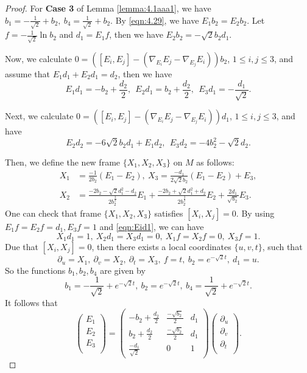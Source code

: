 \documentclass[reqno]{amsart}%
\theoremstyle{definition}
\numberwithin{equation}{section}
\begin{document}
\begin{proof}
For {\bf Case 3} of Lemma \ref{lemma:4.1aaa1}, we have $b_1=-\frac{1}{\sqrt{2}}+b_2,\ b_4=\frac{1}{\sqrt{2}}+b_2$. By \eqref{eqn:4.29}, we have $E_1b_2=E_2b_2$. Let $f=-\frac{1}{\sqrt{2}}\ln b_2$ and $d_1=E_1f$,
then we have $E_2b_2=-\sqrt{2}b_2d_1$.

Now, we calculate $0=([E_i,E_j]-(\nabla_{E_i}{E_j}-\nabla_{E_j}{E_i}))b_2$, $1\leq i,j\leq3$, and assume that $E_1d_1+E_2d_1=d_2$, then we have
\begin{equation}\label{eqn:Eid1}
E_1d_1=-b_2+\frac{d_2}{2},\ \ E_2d_1=b_2+\frac{d_2}{2},\ \ E_3d_1=-\frac{d_1}{\sqrt{2}}.
\end{equation}

Next, we calculate $0=([E_i,E_j]-(\nabla_{E_i}{E_j}-\nabla_{E_j}{E_i}))d_1$, $1\leq i,j\leq3$, and have
\begin{equation}\label{eqn:Eid2}
E_2d_2=-6\sqrt{2}b_2d_1+E_1d_2,\ \ E_3d_2=-4b_2^2-\sqrt{2}d_2.
\end{equation}

Then, we define the new frame $\{X_1,X_2,X_3\}$ on $M$ as follows:
$$
\begin{aligned}
X_1&=\frac{-1}{2b_2}(E_1-E_2),\ X_3=\frac{-d_1}{2\sqrt{2}b_2}(E_1-E_2)+E_3,\\
X_2&=\frac{-2b_2-\sqrt{2}d_1^2-d_2}{2b_2^{\frac{3}{2}}}E_1+\frac{-2b_2+\sqrt{2}d_1^2+d_2}
{2b_2^{\frac{3}{2}}}E_2+\frac{2d_1}{\sqrt{b_2}}E_3.
\end{aligned}
$$
One can check that frame $\{X_1,X_2,X_3\}$ satisfies $[X_i,X_j]=0$. By using $E_1f=E_2f=d_1,E_3f=1$ and
\eqref{eqn:Eid1}, we can have
$$
X_1d_1=1,\ X_2d_1=X_3d_1=0,\ X_1f=X_2f=0,\ X_3f=1.
$$
Due that $[X_i,X_j]=0$, then there exists a local coordinates $\{u,v,t\}$, such that
$$
\partial_u=X_1,\ \partial_v=X_2,\ \partial_t=X_3,\ f=t,\ b_2=e^{-\sqrt{2}t},\ d_1=u.
$$
So the functions $b_1,b_2,b_4$ are given by
%
\begin{equation}\label{eqn:3.1ff1}
b_1=-\frac{1}{\sqrt{2}}+e^{-\sqrt{2}t},\ b_2=e^{-\sqrt{2}t},\ b_4=\frac{1}{\sqrt{2}}+e^{-\sqrt{2}t}.
\end{equation}
It follows that
\begin{equation}\label{eqn:d1d2}
\left(
  \begin{array}{c}
    E_1 \\
    E_2 \\
    E_3 \\
  \end{array}
\right)
=\left(\begin{array}{cccc}
-b_2+\frac{d_2}{2} & \frac{-\sqrt{b_2}}{2} & d_1 \\
b_2+\frac{d_2}{2} & \frac{-\sqrt{b_2}}{2} & d_1 \\
\frac{-d_1}{\sqrt{2}} & 0 & 1
\end{array}\right)
\left(
  \begin{array}{c}
    \partial_u \\
    \partial_v \\
    \partial_t \\
  \end{array}
\right).
\end{equation}


\end{proof}
\end{document}
